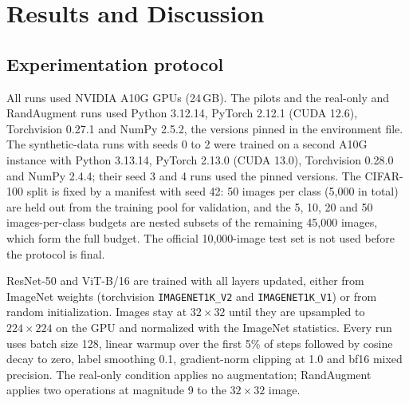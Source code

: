 \documentclass{scrartcl}
\begin{document}
\section{Results and Discussion}


\subsection{Experimentation protocol}
\label{sec:protocol}

All runs used NVIDIA A10G GPUs (24\,GB). The pilots and the real-only and RandAugment runs used Python 3.12.14, PyTorch 2.12.1 (CUDA 12.6), Torchvision 0.27.1 and NumPy 2.5.2, the versions pinned in the environment file. The synthetic-data runs with seeds 0 to 2 were trained on a second A10G instance with Python 3.13.14, PyTorch 2.13.0 (CUDA 13.0), Torchvision 0.28.0 and NumPy 2.4.4; their seed 3 and 4 runs used the pinned versions. The CIFAR-100 split is fixed by a manifest with seed 42: 50 images per class (5,000 in total) are held out from the training pool for validation, and the 5, 10, 20 and 50 images-per-class budgets are nested subsets of the remaining 45,000 images, which form the full budget. The official 10,000-image test set is not used before the protocol is final.

ResNet-50 and ViT-B/16 are trained with all layers updated, either from ImageNet weights (torchvision \texttt{IMAGENET1K\_V2} and \texttt{IMAGENET1K\_V1}) or from random initialization. Images stay at $32\times32$ until they are upsampled to $224\times224$ on the GPU and normalized with the ImageNet statistics. Every run uses batch size 128, linear warmup over the first 5\% of steps followed by cosine decay to zero, label smoothing 0.1, gradient-norm clipping at 1.0 and bf16 mixed precision. The real-only condition applies no augmentation; RandAugment applies two operations at magnitude 9 to the $32\times32$ image.
\end{document}
